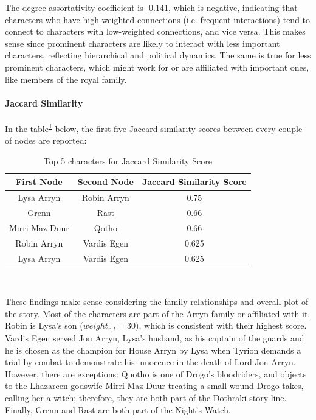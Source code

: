 \documentclass[10pt,twocolumn,letterpaper]{article}
\begin{document}
The degree assortativity coefficient is -0.141, which is negative, indicating that characters who have high-weighted connections (i.e. frequent interactions) tend to connect to characters with low-weighted connections, and vice versa. This makes sense since prominent characters are likely to interact with less important characters, reflecting hierarchical and political dynamics. The same is true for less prominent characters, which might work for or are affiliated with important ones, like members of the royal family.

\paragraph{Jaccard Similarity}

In the table\textsuperscript{\ref{tab:jac_s1}} below, the first five Jaccard similarity scores between every couple of nodes are reported: \\

\begin{table}[!h]
    \centering
    \small
    \begin{tabular}{c|c|c}
        First Node & Second Node & \small{Jaccard Similarity Score}  \\
        \hline
        Lysa Arryn & Robin Arryn & 0.75 \\
        Grenn & Rast & 0.66 \\
        Mirri Maz Duur & Qotho & 0.66 \\
        Robin Arryn & Vardis Egen & 0.625 \\
        Lysa Arryn & Vardis Egen & 0.625 \\     
        \hline 
    \end{tabular} \\
    \caption{Top 5 characters for Jaccard Similarity Score}
    \label{tab:jac_s1}
\end{table}

These findings make sense considering the family relationships and overall plot of the story. Most of the characters are part of the Arryn family or affiliated with it. Robin is Lysa's son ($weight_{r,l}=30)$, which is consistent with their highest score. Vardis Egen served Jon Arryn, Lysa's husband, as his captain of the guards and he is chosen as the champion for House Arryn by Lysa when Tyrion demands a trial by combat to demonstrate his innocence in the death of Lord Jon Arryn. 
However, there are exceptions: Quotho is one of Drogo's bloodriders, and objects to the Lhazareen godswife Mirri Maz Duur treating a small wound Drogo takes, calling her a witch; therefore, they are both part of the Dothraki story line. Finally, Grenn and Rast are both part of the Night's Watch.
\end{document}
